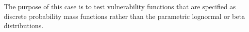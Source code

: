 The purpose of this case is to test vulnerability functions that are specified as discrete probability mass functions rather than the parametric lognormal or beta distributions.
